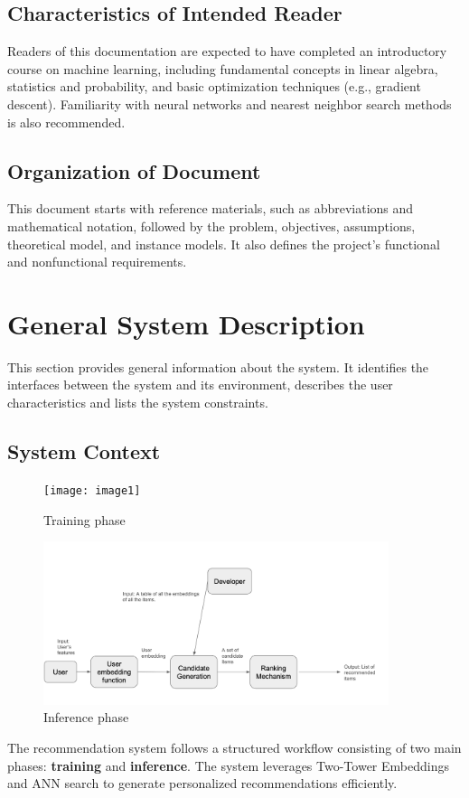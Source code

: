 \documentclass[12pt]{article}
\begin{document}
\subsection{Characteristics of Intended Reader} \label{sec_IntendedReader}
Readers of this documentation are expected to have completed an introductory course on machine learning, including fundamental concepts in linear algebra, statistics and probability, and basic optimization techniques (e.g., gradient descent). Familiarity with neural networks and nearest neighbor search methods is also recommended.

\subsection{Organization of Document}

This document starts with reference materials, such as abbreviations and mathematical notation, followed by the problem, objectives, assumptions, theoretical model, and instance models. It also defines the project's functional and nonfunctional requirements.

\section{General System Description}

This section provides general information about the system.  It identifies the
interfaces between the system and its environment, describes the user
characteristics and lists the system constraints. 

\subsection{System Context}

\begin{figure}[h!]
\begin{center}
 \texttt{[image: image1]}
\caption{Training phase}
\label{Fig_SystemContext1} 
\end{center}

\end{figure}
\begin{figure}[h!]
  \begin{center}
   \includegraphics[width=0.9\textwidth]{image2}
  \caption{Inference phase}
  \label{Fig_SystemContext2} 
  \end{center}
  \end{figure}
The recommendation system follows a structured workflow consisting of two main phases: \textbf{training} and \textbf{inference}. The system leverages Two-Tower Embeddings and ANN search to generate personalized recommendations efficiently.
\end{document}
